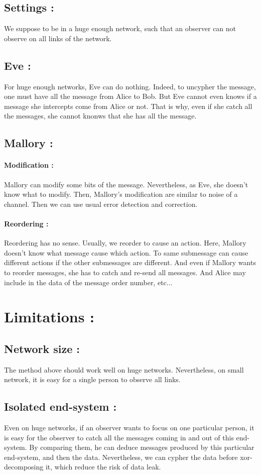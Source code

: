 \documentclass[a4paper, onecolumn, 10pt]{article}
\numberwithin{equation}{section}
\begin{document}
\subsection{Settings :}
We suppose to be in a huge enough network, such that an observer can not observe on all links of the network.
\subsection{Eve :}
For huge enough networks, Eve can do nothing. Indeed, to uncypher the message, one must have all the message from Alice to Bob. But Eve cannot even knows if a message she intercepts come from Alice or not. That is why, even if she catch all the messages, she cannot knonws that she has all the message. 
\subsection{Mallory :}
\paragraph{Modification :}
Mallory can modify some bits of the message. Nevertheless, as Eve, she doesn't know what to modify. Then, Mallory's modification are similar to noise of a channel. Then we can use usual error detection and correction.
\paragraph{Reordering :}
Reordering has no sense. Usually, we reorder to cause an action. Here, Mallory doesn't know what message cause which action. To same submessage can cause different actions if the other submessages are different. And even if Mallory wants to reorder messages, she has to catch and re-send all messages. And Alice may include in the data of the message order number, etc...

\section{Limitations :}
\subsection{Network size :}
The method above should work well on huge networks. Nevertheless, on small network, it is easy for a single person to observe all links. 
\subsection{Isolated end-system :}
Even on huge networks, if an observer wants to focus on one particular person, it is easy for the observer to catch all the messages coming in and out of this end-system. By comparing them, he can deduce messages produced by this particular end-system, and then the data. Nevertheless, we can cypher the data before xor-decomposing it, which reduce the risk of data leak.
\end{document}
